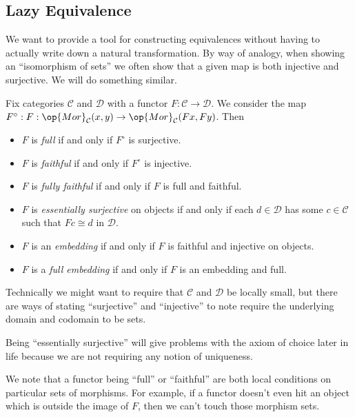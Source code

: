 \subsection{Lazy Equivalence}
We want to provide a tool for constructing equivalences without having to actually write down a natural transformation. By way of analogy, when showing an ``isomorphism of sets'' we often show that a given map is both injective and surjective. We will do something similar.
\begin{definition}
	Fix categories $\mathcal C$ and $\mathcal D$ with a functor $F:\mathcal C\to\mathcal D$. We consider the map $F^\circ:F:\op{Mor}_\mathcal C(x,y)\to\op{Mor}_\mathcal C(Fx,Fy)$. Then
	\begin{itemize}
		\item $F$ is \textit{full} if and only if $F^\circ$ is surjective.
		\item $F$ is \textit{faithful} if and only if $F^\circ$ is injective.
		\item $F$ is \textit{fully faithful} if and only if $F$ is full and faithful.
		\item $F$ is \textit{essentially surjective} on objects if and only if each $d\in\mathcal D$ has some $c\in\mathcal C$ such that $Fc\cong d$ in $\mathcal D$.
		\item $F$ is an \textit{embedding} if and only if $F$ is faithful and injective on objects.
		\item $F$ is a \textit{full embedding} if and only if $F$ is an embedding and full.
	\end{itemize}
\end{definition}
\begin{remark}
	Technically we might want to require that $\mathcal C$ and $\mathcal D$ be locally small, but there are ways of stating ``surjective'' and ``injective'' to note require the underlying domain and codomain to be sets.
\end{remark}
\begin{remark}
	Being ``essentially surjective'' will give problems with the axiom of choice later in life because we are not requiring any notion of uniqueness.
\end{remark}
We note that a functor being ``full'' or ``faithful'' are both local conditions on particular sets of morphisms. For example, if a functor doesn't even hit an object which is outside the image of $F$, then we can't touch those morphism sets.

